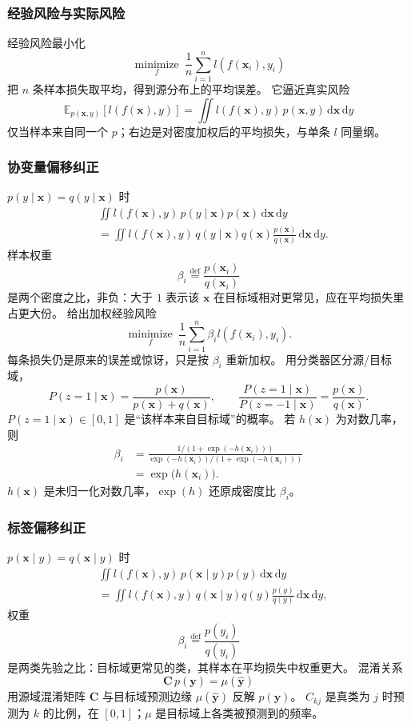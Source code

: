 \subsubsection{经验风险与实际风险}

经验风险最小化
\[
\operatorname*{minimize}_{f}\ \frac{1}{n}\sum_{i=1}^{n}l(f(\bm{x}_{i}),y_{i})
\]
把 $n$ 条样本损失取平均，得到源分布上的平均误差。
它逼近真实风险
\[
\mathbb{E}_{p(\bm{x},y)}[l(f(\bm{x}),y)]
=
\iint l(f(\bm{x}),y)\,p(\bm{x},y)\,\mathrm{d}\bm{x}\,\mathrm{d}y
\]
仅当样本来自同一个 $p$；右边是对密度加权后的平均损失，与单条 $l$ 同量纲。

\subsubsection{协变量偏移纠正}

$p(y\mid\bm{x})=q(y\mid\bm{x})$ 时
\begin{align*}
&\iint l(f(\bm{x}),y)\,p(y\mid\bm{x})p(\bm{x})\,\mathrm{d}\bm{x}\,\mathrm{d}y\\
&=
\iint l(f(\bm{x}),y)\,q(y\mid\bm{x})q(\bm{x})\frac{p(\bm{x})}{q(\bm{x})}\,\mathrm{d}\bm{x}\,\mathrm{d}y.
\end{align*}
样本权重
\[
\beta_{i}\stackrel{\mathrm{def}}{=}\frac{p(\bm{x}_{i})}{q(\bm{x}_{i})}
\]
是两个密度之比，非负：大于 $1$ 表示该 $\bm{x}$ 在目标域相对更常见，应在平均损失里占更大份。
给出加权经验风险
\[
\operatorname*{minimize}_{f}\ \frac{1}{n}\sum_{i=1}^{n}\beta_{i}l(f(\bm{x}_{i}),y_{i}).
\]
每条损失仍是原来的误差或惊讶，只是按 $\beta_i$ 重新加权。
用分类器区分源/目标域，
\[
P(z=1\mid\bm{x})=\frac{p(\bm{x})}{p(\bm{x})+q(\bm{x})},
\qquad
\frac{P(z=1\mid\bm{x})}{P(z=-1\mid\bm{x})}=\frac{p(\bm{x})}{q(\bm{x})}.
\]
$P(z=1\mid\bm{x})\in[0,1]$ 是“该样本来自目标域”的概率。
若 $h(\bm{x})$ 为对数几率，则
\begin{align*}
\beta_{i}
&=
\frac{1/(1+\exp(-h(\bm{x}_{i})))}{\exp(-h(\bm{x}_{i}))/(1+\exp(-h(\bm{x}_{i})))}\\
&=
\exp\bigl(h(\bm{x}_{i})\bigr).
\end{align*}
$h(\bm{x})$ 是未归一化对数几率，$\exp(h)$ 还原成密度比 $\beta_i$。

\subsubsection{标签偏移纠正}

$p(\bm{x}\mid y)=q(\bm{x}\mid y)$ 时
\begin{align*}
&\iint l(f(\bm{x}),y)\,p(\bm{x}\mid y)p(y)\,\mathrm{d}\bm{x}\,\mathrm{d}y\\
&=
\iint l(f(\bm{x}),y)\,q(\bm{x}\mid y)q(y)\frac{p(y)}{q(y)}\,\mathrm{d}\bm{x}\,\mathrm{d}y,
\end{align*}
权重
\[
\beta_{i}\stackrel{\mathrm{def}}{=}\frac{p(y_{i})}{q(y_{i})}
\]
是两类先验之比：目标域更常见的类，其样本在平均损失中权重更大。
混淆关系
\[
\bm{C}\,p(\bm{y})=\mu(\hat{\bm{y}})
\]
用源域混淆矩阵 $\bm{C}$ 与目标域预测边缘 $\mu(\hat{\bm{y}})$ 反解 $p(\bm{y})$。
$C_{kj}$ 是真类为 $j$ 时预测为 $k$ 的比例，在 $[0,1]$；$\mu$ 是目标域上各类被预测到的频率。

